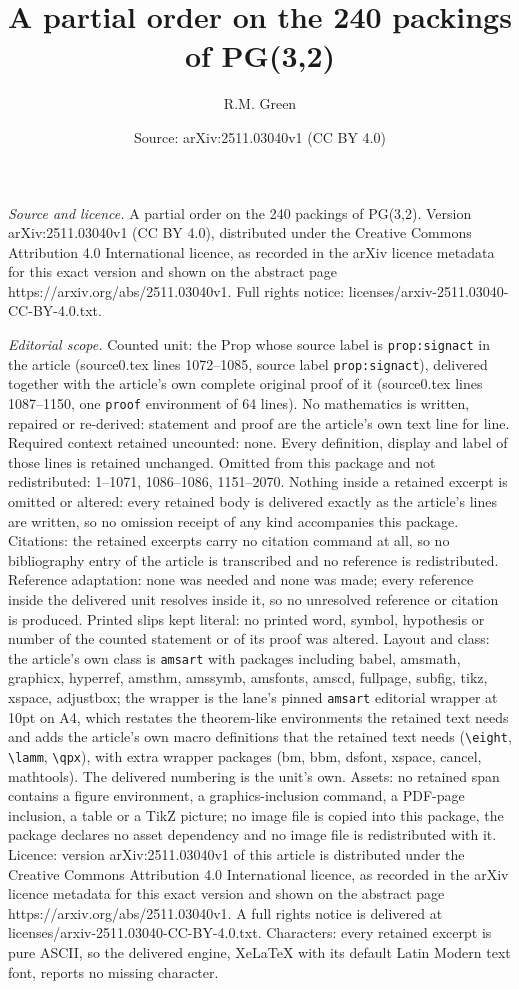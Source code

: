 \documentclass[10pt,a4paper]{amsart}
\title[A partial order on the 240 packings of PG(3,2)]{A partial order on the 240 packings of PG(3,2)}
\author{R.M. Green}
\date{Source: arXiv:2511.03040v1 (CC BY 4.0)}
\begin{document}
\maketitle

\noindent\emph{Source and licence.} A partial order on the 240 packings of PG(3,2). Version arXiv:2511.03040v1 (CC BY 4.0), distributed under the Creative Commons Attribution 4.0 International licence, as recorded in the arXiv licence metadata for this exact version and shown on the abstract page https://arxiv.org/abs/2511.03040v1. Full rights notice: licenses/arxiv-2511.03040-CC-BY-4.0.txt.\par\smallskip

\noindent\textit{Editorial scope.} Counted unit: the Prop whose source label is \texttt{prop:signact} in the article (source0.tex lines 1072--1085, source label \texttt{prop:signact}), delivered together with the article's own complete original proof of it (source0.tex lines 1087--1150, one \texttt{proof} environment of 64 lines). No mathematics is written, repaired or re-derived: statement and proof are the article's own text line for line. Required context retained uncounted: none. Every definition, display and label of those lines is retained unchanged. Omitted from this package and not redistributed: 1--1071, 1086--1086, 1151--2070. Nothing inside a retained excerpt is omitted or altered: every retained body is delivered exactly as the article's lines are written, so no omission receipt of any kind accompanies this package. Citations: the retained excerpts carry no citation command at all, so no bibliography entry of the article is transcribed and no reference is redistributed. Reference adaptation: none was needed and none was made; every reference inside the delivered unit resolves inside it, so no unresolved reference or citation is produced. Printed slips kept literal: no printed word, symbol, hypothesis or number of the counted statement or of its proof was altered. Layout and class: the article's own class is \texttt{amsart} with packages including babel, amsmath, graphicx, hyperref, amsthm, amssymb, amsfonts, amscd, fullpage, subfig, tikz, xspace, adjustbox; the wrapper is the lane's pinned \texttt{amsart} editorial wrapper at 10pt on A4, which restates the theorem-like environments the retained text needs and adds the article's own macro definitions that the retained text needs (\texttt{\textbackslash eight}, \texttt{\textbackslash lamm}, \texttt{\textbackslash qpx}), with extra wrapper packages (bm, bbm, dsfont, xspace, cancel, mathtools). The delivered numbering is the unit's own. Assets: no retained span contains a figure environment, a graphics-inclusion command, a PDF-page inclusion, a table or a TikZ picture; no image file is copied into this package, the package declares no asset dependency and no image file is redistributed with it. Licence: version arXiv:2511.03040v1 of this article is distributed under the Creative Commons Attribution 4.0 International licence, as recorded in the arXiv licence metadata for this exact version and shown on the abstract page https://arxiv.org/abs/2511.03040v1. A full rights notice is delivered at licenses/arxiv-2511.03040-CC-BY-4.0.txt. Characters: every retained excerpt is pure ASCII, so the delivered engine, XeLaTeX with its default Latin Modern text font, reports no missing character.
\end{document}
